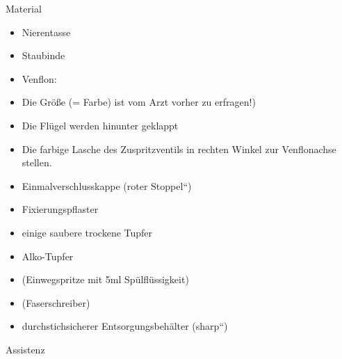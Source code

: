 \documentclass{article}
\begin{document}
{\mdseries\color{black}
Material}

\begin{itemize}
\item {\mdseries
Nierentasse }

\item {\mdseries
Staubinde}

\item {\mdseries
Venflon: }

\end{itemize}
\begin{itemize}
\item {\mdseries
Die Gr\"o{\ss}e (= Farbe) ist vom Arzt vorher zu erfragen!)}

\item {\mdseries
Die Fl\"ugel werden hinunter geklappt}

\item {\mdseries
Die farbige Lasche des Zuspritzventils in rechten Winkel zur
Venflonachse stellen.}

\end{itemize}
\begin{itemize}
\item {\mdseries
Einmalverschlusskappe ({\quotedblbase}roter Stoppel{\textquotedblleft})}

\item {\mdseries
Fixierungspflaster}

\item {\mdseries
einige saubere trockene Tupfer}

\item {\mdseries
Alko-Tupfer}

\item {\mdseries
(Einwegspritze mit 5ml Sp\"ulfl\"ussigkeit)}

\item {\mdseries
(Faserschreiber)}

\item {\mdseries
durchstichsicherer Entsorgungsbeh\"alter
({\quotedblbase}sharp{\textquotedblleft})}

\end{itemize}
{\mdseries\color{black}
Assistenz}
\end{document}
